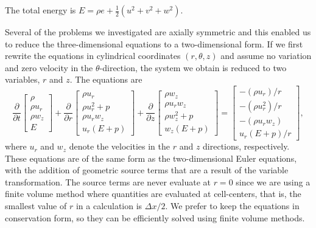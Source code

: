 \documentclass{article}
\begin{document}
The total energy is $E 
= \rho e + \frac{1}{2}(u^2 + v^2 + w^2)$.

Several of the problems we investigated are axially symmetric and this enabled us to reduce the 
three-dimensional equations to a two-dimensional form.  If we first rewrite the equations in cylindrical 
coordinates $(r,\theta,z)$ and assume no variation and zero velocity in the $\theta$-direction, the 
system we obtain is reduced to two variables, $r$ and $z$.  The equations are
\begin{equation}
	\frac{\partial}{\partial t} \left[ \begin{array}{c} \rho \\ \rho u_r \\ \rho w_z \\ E \end{array} \right] +
	\frac{\partial}{\partial r} \left[ \begin{array}{c} \rho u_r \\ \rho u_r^2 + p \\ \rho u_r w_z \\ u_r(E+p) 
\end{array} \right] + 
	\frac{\partial}{\partial z} \left[ \begin{array}{c} \rho w_z \\ \rho u_r w_z\\ \rho w_z^2 + p \\ w_z(E+p) 
\end{array} \right ] = 
	\left[ \begin{array}{c} -(\rho u_r)/r \\ -(\rho u_r^2)/r \\ -(\rho u_r w_z) \\ u_r(E+p)/r \end{array} \right ],  
	\label{eqn:2daxisymeuler}
\end{equation}
where $u_r$ and $w_z$ denote the velocities in the $r$ and $z$ directions, respectively.  These 
equations are of the same form as the two-dimensional Euler equations, 
with the addition of geometric source terms that 
are a result of the variable transformation.  The source terms are never evaluate at $r=0$ since we are using a finite volume method where quantities are evaluated at cell-centers, that is, the smallest value of $r$ in a calculation is $\Delta x/2$.  We prefer to keep the equations in conservation form, so they can be efficiently solved using finite volume methods. 
\end{document}
